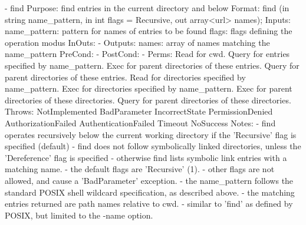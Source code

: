 \begin{myspec}
 
    - find
      Purpose:  find entries in the current directory and below
      Format:   find               (in  string  name_pattern,
                                    in  int     flags = Recursive,
                                    out array<url> names);
      Inputs:   name_pattern:       pattern for names of
                                    entries to be found
                flags:              flags defining the operation
                                    modus
      InOuts:   -
      Outputs:  names:              array of names matching the
                                    name_pattern
      PreCond:  -
      PostCond: -
      Perms:    Read  for cwd.
                Query for entries specified by name_pattern.
                Exec  for parent directories of these entries.
                Query for parent directories of these entries.
                Read  for directories specified by name_pattern.
                Exec  for directories specified by name_pattern.
                Exec  for parent directories of these directories.
                Query for parent directories of these directories.
      Throws:   NotImplemented
                BadParameter
                IncorrectState
                PermissionDenied
                AuthorizationFailed
                AuthenticationFailed
                Timeout
                NoSuccess
      Notes:    - find operates recursively below the current
                  working directory if the 'Recursive' flag is
                  specified (default)
                - find does not follow symbolically linked
                  directories, unless the 'Dereference' flag
                  is specified - otherwise find lists symbolic 
                  link entries with a matching name.
                - the default flags are 'Recursive' (1).
                - other flags are not allowed, and cause a
                  'BadParameter' exception.
                - the name_pattern follows the standard POSIX 
                  shell wildcard specification, as described 
                  above.
                - the matching entries returned are path names 
                  relative to cwd.
                - similar to 'find' as defined by POSIX, but
                  limited to the -name option.
 

\end{myspec}
